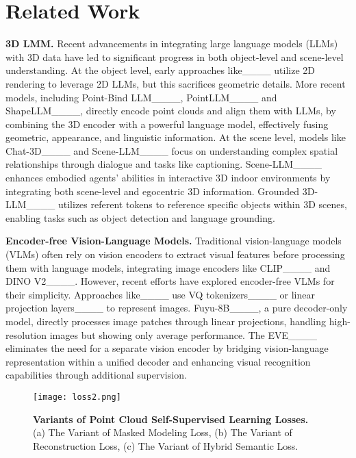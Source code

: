 \section{Related Work}
\textbf{3D LMM.} 
Recent advancements in integrating large language models (LLMs) with 3D data have led to significant progress in both object-level and scene-level understanding.
At the object level, early approaches like____ utilize 2D rendering to leverage 2D LLMs, but this sacrifices geometric details. More recent models, including Point-Bind LLM____, PointLLM____ and ShapeLLM____, directly encode point clouds and align them with LLMs, by combining the 3D encoder with a powerful language model, effectively fusing geometric, appearance, and linguistic information.
At the scene level, models like Chat-3D____ and Scene-LLM____ focus on understanding complex spatial relationships through dialogue and tasks like captioning. 
Scene-LLM____ enhances embodied agents' abilities in interactive 3D indoor environments by integrating both scene-level and egocentric 3D information.
Grounded 3D-LLM____ utilizes referent tokens to reference specific objects within 3D scenes, enabling tasks such as object detection and language grounding.

\textbf{Encoder-free Vision-Language Models.} 
Traditional vision-language models (VLMs) often rely on vision encoders to extract visual features before processing them with language models, integrating image encoders like CLIP____ and DINO V2____. 
However, recent efforts have explored encoder-free VLMs for their simplicity. 
Approaches like____ use VQ tokenizers____ or linear projection layers____ to represent images.
Fuyu-8B____, a pure decoder-only model, directly processes image patches through linear projections, handling high-resolution images but showing only average performance. 
The EVE____ eliminates the need for a separate vision encoder by bridging vision-language representation within a unified decoder and enhancing visual recognition capabilities through additional supervision.


\begin{figure}[!h]
\centering
\texttt{[image: loss2.png]}
\vspace{-0.2cm}
\caption{\textbf{Variants of Point Cloud Self-Supervised Learning Losses.} 
(a) The Variant of Masked Modeling Loss, (b) The Variant of Reconstruction Loss, (c) The Variant of Hybrid Semantic Loss.}
  \label{loss2}
\end{figure}